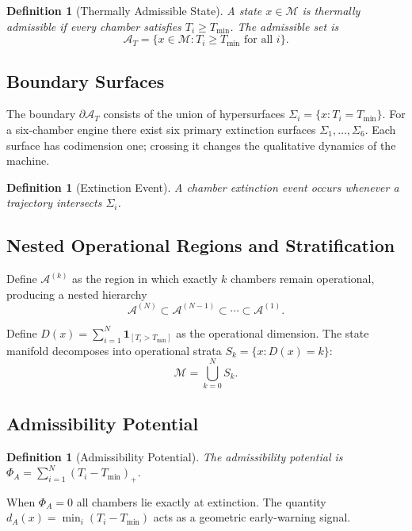 \documentclass[12pt,a4paper]{article}
\newtheorem{definition}[theorem]{Definition}
\newcommand{\A}{\mathcal{A}}
\newcommand{\M}{\mathcal{M}}
\begin{document}
\begin{definition}[Thermally Admissible State]
A state $x \in \M$ is \emph{thermally admissible} if every chamber satisfies $T_i \ge T_{\min}$. The admissible set is
\[
\A_T = \bigl\{ x \in \M : T_i \ge T_{\min} \text{ for all } i \bigr\}.
\]
\end{definition}

\subsection{Boundary Surfaces}

The boundary $\partial \A_T$ consists of the union of hypersurfaces $\Sigma_i = \{ x : T_i = T_{\min} \}$. For a six-chamber engine there exist six primary extinction surfaces $\Sigma_1, \ldots, \Sigma_6$. Each surface has codimension one; crossing it changes the qualitative dynamics of the machine.

\begin{definition}[Extinction Event]
A \emph{chamber extinction event} occurs whenever a trajectory intersects $\Sigma_i$.
\end{definition}

\subsection{Nested Operational Regions and Stratification}

Define $\A^{(k)}$ as the region in which exactly $k$ chambers remain operational, producing a nested hierarchy
\[
\A^{(N)} \subset \A^{(N-1)} \subset \cdots \subset \A^{(1)}.
\]

Define $D(x) = \sum_{i=1}^{N} \mathbf{1}_{[T_i > T_{\min}]}$ as the operational dimension. The state manifold decomposes into operational strata $S_k = \{ x : D(x) = k \}$:
\[
\M = \bigcup_{k=0}^{N} S_k.
\]

\subsection{Admissibility Potential}

\begin{definition}[Admissibility Potential]
The \emph{admissibility potential} is $\Phi_A = \sum_{i=1}^{N} (T_i - T_{\min})_+$.
\end{definition}

When $\Phi_A = 0$ all chambers lie exactly at extinction. The quantity $d_A(x) = \min_i (T_i - T_{\min})$ acts as a geometric early-warning signal.
\end{document}
